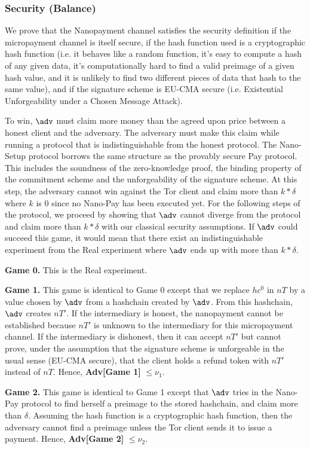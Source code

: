 \subsubsection{Security (Balance)}

We prove that the Nanopayment channel satisfies the security definition if the micropayment channel is itself secure, if the hash function used is a cryptographic hash function (i.e. it behaves like a random function, it's easy to compute a hash of any given data, it's computationally hard to find a valid preimage of a given hash value, and it is unlikely to find two different pieces of data that hash to the same value), and if the signature scheme is EU-CMA secure (i.e. Existential Unforgeability under a Chosen Message Attack).

To win, $\adv$ must claim more money than the agreed upon price between a honest
client and the adversary. The adversary must make this claim while running a
protocol that is indistinguishable from the honest protocol. The Nano-Setup
protocol borrows the same structure as the provably secure Pay protocol. This
includes the soundness of the zero-knowledge proof, the binding property of the
commitment scheme and the unforgeability of the signature scheme. At this step,
the adversary cannot win against the Tor client and claim more than $k*\delta$
where $k$ is 0 since no Nano-Pay has been executed yet. For the following steps
of the protocol, we proceed by showing that $\adv$ cannot diverge from the
protocol and claim more than $k*\delta$ with our classical security
assumptions. If $\adv$ could succeed this game, it would mean that there exist
an indistinguishable experiment from the Real experiment where $\adv$ ends up
with more than $k*\delta$.

\textbf{Game 0.} This is the Real experiment.

\textbf{Game 1.} This game is identical to Game 0 except that we replace $hc^0$ in $nT$ by a value chosen by $\adv$ from a hashchain created by $\adv$. From this hashchain, $\adv$ creates $nT'$. If the intermediary is honest, the nanopayment cannot be established because $nT'$ is unknown to the intermediary for this micropayment channel. If the intermediary is dishonest, then it can accept $nT'$ but cannot prove, under the assumption that the signature scheme is unforgeable in the usual sense (EU-CMA secure), that the client holds a refund token with $nT'$ instead of $nT$. Hence, \textbf{Adv[Game 1]} $\leq \nu_1$.

\textbf{Game 2.} This game is identical to Game 1 except that $\adv$ tries in
the Nano-Pay protocol to find herself a preimage to the stored hashchain, and
claim more than $\delta$. Assuming the hash function is a cryptographic hash
function, then the adversary cannot find a preimage unless the Tor client sends
it to issue a payment. Hence, \textbf{Adv[Game 2]} $\leq \nu_2$.

